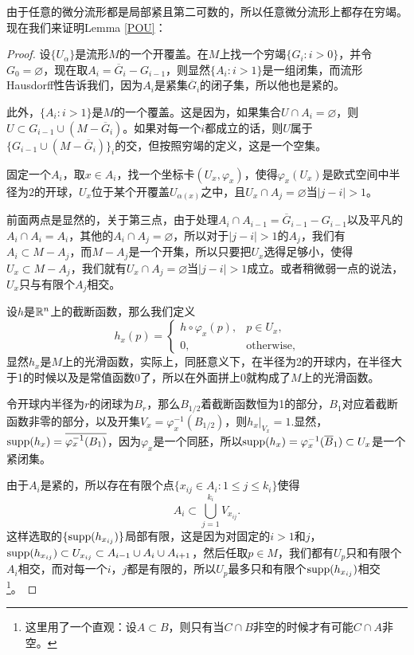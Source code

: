 由于任意的微分流形都是局部紧且第二可数的，所以任意微分流形上都存在穷竭。现在我们来证明Lemma \ref{POU}：

\begin{proof}
设$\{U_{\alpha}\}$是流形$M$的一个开覆盖。在$M$上找一个穷竭$\{G_i:i>0\}$，并令$G_0=\varnothing$，现在取$A_i=\overline{G}_i-G_{i-1}$，则显然$\{A_i:i>1\}$是一组闭集，而流形Hausdorff性告诉我们，因为$A_i$是紧集$\overline{G}_i$的闭子集，所以他也是紧的。

此外，$\{A_i:i>1\}$是$M$的一个覆盖。这是因为，如果集合$U\cap A_i=\varnothing$，则$U\subset G_{i-1}\cup (M-\overline{G}_{i})$。如果对每一个$i$都成立的话，则$U$属于$\{G_{i-1}\cup (M-\overline{G}_{i})\}_i$的交，但按照穷竭的定义，这是一个空集。

固定一个$A_i$，取$x\in A_i$，找一个坐标卡$(U_x,\varphi_x)$，使得$\varphi_x(U_x)$是欧式空间中半径为$2$的开球，$U_x$位于某个开覆盖$U_{\alpha(x)}$之中，且$U_x\cap A_j=\varnothing$当$|j-i|>1$。

前面两点是显然的，关于第三点，由于处理$A_i\cap A_{i-1}= \overline{G}_{i-1}-G_{i-1}$以及平凡的$A_i\cap A_i=A_i$，其他的$A_i\cap A_j=\varnothing$，所以对于$|j-i|>1$的$A_j$，我们有$A_i\subset M-A_j$，而$M-A_j$是一个开集，所以只要把$U_x$选得足够小，使得$U_x\subset M-A_j$，我们就有$U_x\cap A_j=\varnothing$当$|j-i|>1$成立。或者稍微弱一点的说法，$U_x$只与有限个$A_j$相交。

设$h$是$\mathbb{R}^n$上的截断函数，那么我们定义
\[
	h_x(p)=\begin{cases}h\circ \varphi_x(p),& p\in U_x,\\
	0,&\text{otherwise},
	\end{cases}
\]
显然$h_x$是$M$上的光滑函数，实际上，同胚意义下，在半径为2的开球内，在半径大于1的时候以及是常值函数0了，所以在外面拼上0就构成了$M$上的光滑函数。

令开球内半径为$r$的闭球为$B_r$，那么$B_{1/2}$着截断函数恒为1的部分，$B_{1}$对应着截断函数非零的部分，以及开集$V_x=\varphi_x^{-1}(B_{1/2})$，则$h_x|_{V_x}=1$.显然，$\operatorname{supp}(h_{x})=\overline{\varphi_x^{-1}(B_1)}$，因为$\varphi_x$是一个同胚，所以$\operatorname{supp}(h_{x})=\varphi_x^{-1}(\overline{B}_1)\subset U_x$是一个紧闭集。

由于$A_i$是紧的，所以存在有限个点$\{x_{ij}\in A_i:1\leq j\leq k_i\}$使得
\[
	A_i\subset \bigcup_{j=1}^{k_i}V_{x_{ij}}.
\]
这样选取的$\{\operatorname{supp}(h_{x_{ij}})\}$局部有限，这是因为对固定的$i>1$和$j$，$\operatorname{supp}(h_{x_{ij}})\subset U_{x_{ij}}\subset A_{i-1}\cup A_i\cup A_{i+1}$，然后任取$p\in M$，我们都有$U_p$只和有限个$A_i$相交，而对每一个$i$，$j$都是有限的，所以$U_p$最多只和有限个$\operatorname{supp}(h_{x_{ij}})$相交\footnote{这里用了一个直观：设$A\subset B$，则只有当$C\cap B$非空的时候才有可能$C\cap A$非空。}。


\end{proof}
